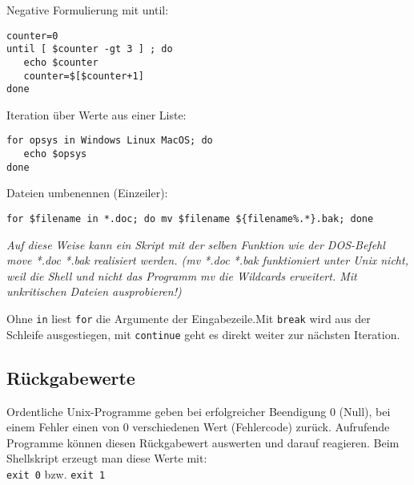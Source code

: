 \documentclass[11pt]{article}
\begin{document}
Negative Formulierung mit until:
\begin{verbatim}
counter=0
until [ $counter -gt 3 ] ; do
   echo $counter
   counter=$[$counter+1]
done
\end{verbatim}


Iteration über Werte aus einer Liste:
\begin{verbatim}
for opsys in Windows Linux MacOS; do
   echo $opsys 
done
\end{verbatim}

Dateien umbenennen (Einzeiler): 
\begin{verbatim}
for $filename in *.doc; do mv $filename ${filename%.*}.bak; done
\end{verbatim}
\textit{Auf diese Weise kann ein Skript mit der selben Funktion wie
  der DOS-Befehl move *.doc *.bak realisiert werden. (mv *.doc *.bak
  funktioniert unter Unix nicht, weil die Shell und nicht das Programm
  mv die Wildcards erweitert. Mit unkritischen Dateien ausprobieren!)}

Ohne \texttt{in} liest \texttt{for} die Argumente der Eingabezeile.Mit
\texttt{break} wird aus der Schleife ausgestiegen, mit
\texttt{continue} geht es direkt weiter zur nächsten Iteration.

\subsection{Rückgabewerte} 
Ordentliche Unix-Programme geben bei erfolgreicher Beendigung 0
(Null), bei einem Fehler einen von 0 verschiedenen Wert (Fehlercode)
zurück. Aufrufende Programme können diesen Rückgabewert auswerten und
darauf reagieren. Beim Shellskript erzeugt man diese Werte mit:\\
\texttt{exit 0} bzw. \texttt{exit 1}
\end{document}
